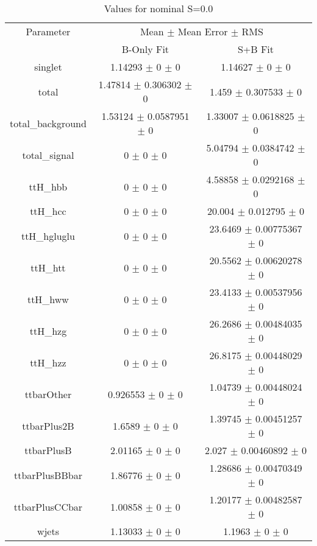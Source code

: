 \begin{table}
\centering
\caption{Values for nominal S=0.0}
\begin{tabular}{ccc}
\toprule
Parameter & \multicolumn{2}{c}{Mean $\pm$ Mean Error $\pm$ RMS}\\
 & B-Only Fit & S+B Fit\\
\midrule
singlet & \num{1.14293} $\pm$ \num{0} $\pm$ \num{0} & \num{1.14627} $\pm$ \num{0} $\pm$ \num{0}\\
total & \num{1.47814} $\pm$ \num{0.306302} $\pm$ \num{0} & \num{1.459} $\pm$ \num{0.307533} $\pm$ \num{0}\\
total\_background & \num{1.53124} $\pm$ \num{0.0587951} $\pm$ \num{0} & \num{1.33007} $\pm$ \num{0.0618825} $\pm$ \num{0}\\
total\_signal & \num{0} $\pm$ \num{0} $\pm$ \num{0} & \num{5.04794} $\pm$ \num{0.0384742} $\pm$ \num{0}\\
ttH\_hbb & \num{0} $\pm$ \num{0} $\pm$ \num{0} & \num{4.58858} $\pm$ \num{0.0292168} $\pm$ \num{0}\\
ttH\_hcc & \num{0} $\pm$ \num{0} $\pm$ \num{0} & \num{20.004} $\pm$ \num{0.012795} $\pm$ \num{0}\\
ttH\_hgluglu & \num{0} $\pm$ \num{0} $\pm$ \num{0} & \num{23.6469} $\pm$ \num{0.00775367} $\pm$ \num{0}\\
ttH\_htt & \num{0} $\pm$ \num{0} $\pm$ \num{0} & \num{20.5562} $\pm$ \num{0.00620278} $\pm$ \num{0}\\
ttH\_hww & \num{0} $\pm$ \num{0} $\pm$ \num{0} & \num{23.4133} $\pm$ \num{0.00537956} $\pm$ \num{0}\\
ttH\_hzg & \num{0} $\pm$ \num{0} $\pm$ \num{0} & \num{26.2686} $\pm$ \num{0.00484035} $\pm$ \num{0}\\
ttH\_hzz & \num{0} $\pm$ \num{0} $\pm$ \num{0} & \num{26.8175} $\pm$ \num{0.00448029} $\pm$ \num{0}\\
ttbarOther & \num{0.926553} $\pm$ \num{0} $\pm$ \num{0} & \num{1.04739} $\pm$ \num{0.00448024} $\pm$ \num{0}\\
ttbarPlus2B & \num{1.6589} $\pm$ \num{0} $\pm$ \num{0} & \num{1.39745} $\pm$ \num{0.00451257} $\pm$ \num{0}\\
ttbarPlusB & \num{2.01165} $\pm$ \num{0} $\pm$ \num{0} & \num{2.027} $\pm$ \num{0.00460892} $\pm$ \num{0}\\
ttbarPlusBBbar & \num{1.86776} $\pm$ \num{0} $\pm$ \num{0} & \num{1.28686} $\pm$ \num{0.00470349} $\pm$ \num{0}\\
ttbarPlusCCbar & \num{1.00858} $\pm$ \num{0} $\pm$ \num{0} & \num{1.20177} $\pm$ \num{0.00482587} $\pm$ \num{0}\\
wjets & \num{1.13033} $\pm$ \num{0} $\pm$ \num{0} & \num{1.1963} $\pm$ \num{0} $\pm$ \num{0}\\
\bottomrule
\end{tabular}
\end{table}